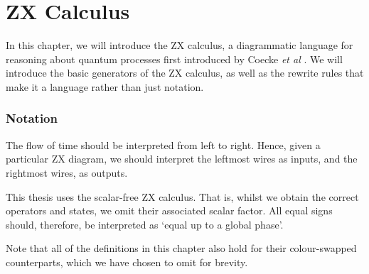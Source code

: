 \chapter{ZX Calculus}%
\label{zx-calculus}

In this chapter, we will introduce the ZX calculus, a diagrammatic language for reasoning about quantum processes first introduced by Coecke \textit{et al} \cite{Coecke2011}. We will introduce the basic generators of the ZX calculus, as well as the rewrite rules that make it a language rather than just notation. 

\subsection{Notation}

The flow of time should be interpreted from left to right. Hence, given a particular ZX diagram, we should interpret the leftmost wires as inputs, and the rightmost wires, as outputs.


This thesis uses the scalar-free ZX calculus. That is, whilst we obtain the correct operators and states, we omit their associated scalar factor. All equal signs should, therefore, be interpreted as `equal up to a global phase'.

Note that all of the definitions in this chapter also hold for their colour-swapped counterparts, which we have chosen to omit for brevity.

